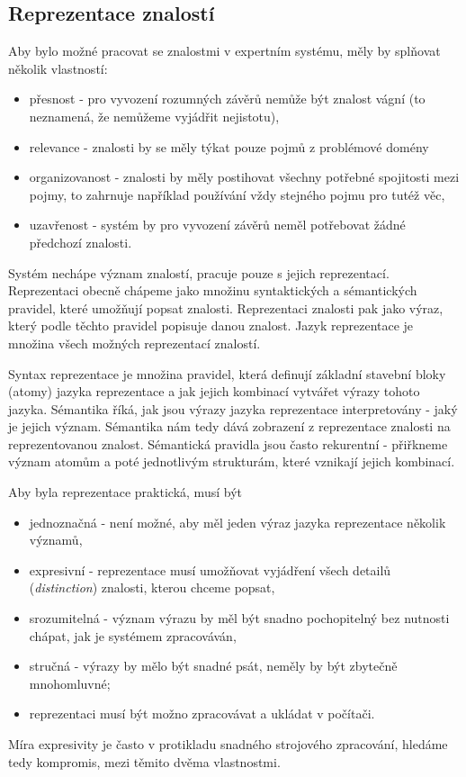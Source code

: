 \subsection{Reprezentace znalostí}


Aby bylo možné pracovat se znalostmi v expertním systému, měly by splňovat
několik vlastností:
\begin{itemize}
  \item přesnost - pro vyvození rozumných závěrů nemůže být znalost vágní (to
    neznamená, že nemůžeme vyjádřit nejistotu),
  \item relevance - znalosti by se měly týkat pouze pojmů z problémové domény
  \item organizovanost - znalosti by měly postihovat všechny potřebné spojitosti
    mezi pojmy, to zahrnuje například používání vždy stejného pojmu pro tutéž
    věc,
  \item uzavřenost - systém by pro vyvození závěrů neměl potřebovat žádné
    předchozí znalosti.
\end{itemize}

Systém nechápe význam znalostí, pracuje pouze s jejich reprezentací.
Reprezentaci obecně chápeme jako množinu syntaktických a sémantických pravidel,
které umožňují popsat znalosti. Reprezentaci znalosti pak jako výraz, který
podle těchto pravidel popisuje danou znalost. Jazyk reprezentace je množina
všech možných reprezentací znalostí.

Syntax reprezentace je množina pravidel, která definují základní stavební bloky
(atomy) jazyka reprezentace a jak jejich kombinací vytvářet výrazy tohoto
jazyka. Sémantika říká, jak jsou výrazy jazyka reprezentace interpretovány -
jaký je jejich význam. Sémantika nám tedy dává zobrazení z reprezentace znalosti
na reprezentovanou znalost. Sémantická pravidla jsou často rekurentní -
přiřkneme význam atomům a poté jednotlivým strukturám, které vznikají jejich
kombinací.

Aby byla reprezentace praktická, musí být
\begin{itemize}
  \item jednoznačná - není možné, aby měl jeden výraz jazyka reprezentace
    několik významů,
  \item expresivní - reprezentace musí umožňovat vyjádření všech detailů
    (\emph{distinction}) znalosti, kterou chceme popsat,
  \item srozumitelná - význam výrazu by měl být snadno pochopitelný bez
    nutnosti chápat, jak je systémem zpracováván,
  \item stručná - výrazy by mělo být snadné psát, neměly by být zbytečně
    mnohomluvné;
  \item reprezentaci musí být možno zpracovávat a ukládat v počítači.
\end{itemize}
Míra expresivity je často v protikladu snadného strojového zpracování, hledáme
tedy kompromis, mezi těmito dvěma vlastnostmi.


